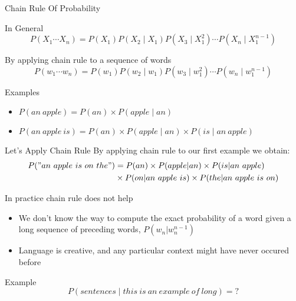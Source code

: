 \documentclass{beamer}
\begin{document}
\begin{frame}{Chain Rule Of Probability}
    \begin{block}{In General}
        $$P(X_1\cdots X_n) = P(X_1)P(X_2\mid X_1)P(X_3\mid X_1^2)\cdots P(X_n\mid X_1^{n-1})$$
    \end{block}
    \begin{block}{By applying chain rule to a sequence of words}
        $$P(w_1\cdots w_n) = P(w_1)P(w_2\mid w_1)P(w_3\mid w_1^2)\cdots P(w_n\mid w_1^{n-1})$$
    \end{block}

    \begin{block}{Examples}
        \begin{itemize}
            \item $P(an\ apple) = P(an)\times P(apple\mid an)$
            \item $P(an\ apple\ is) = P(an)\times P(apple\mid an) \times P(is\mid an\ apple)$
        \end{itemize}
    \end{block}

\end{frame}

\begin{frame}{Let's Apply Chain Rule}
By applying chain rule to our first example we obtain:
    \begin{align*}
        P("an\ apple\ is\ on\ the") &= P(an)\times P(apple|an) \times P(is|an\ apple)\\
                                  &\times P(on|an\ apple\ is) \times P(the|an\ apple\ is\ on) 
    \end{align*}
\end{frame}

\begin{frame}{In practice chain rule does not help}
    \begin{itemize}
        \item We don't know the way to compute the exact probability of a word given a long sequence of preceding words, $P(w_n|w_n^{n-1})$
        \item Language is creative, and any particular context might have never occured before
    \end{itemize}
    \begin{block}{Example}
        $$P(sentences\mid this\ is\ an\ example\ of\ long) = \mathord{?}$$
    \end{block}
\end{frame}
\end{document}
